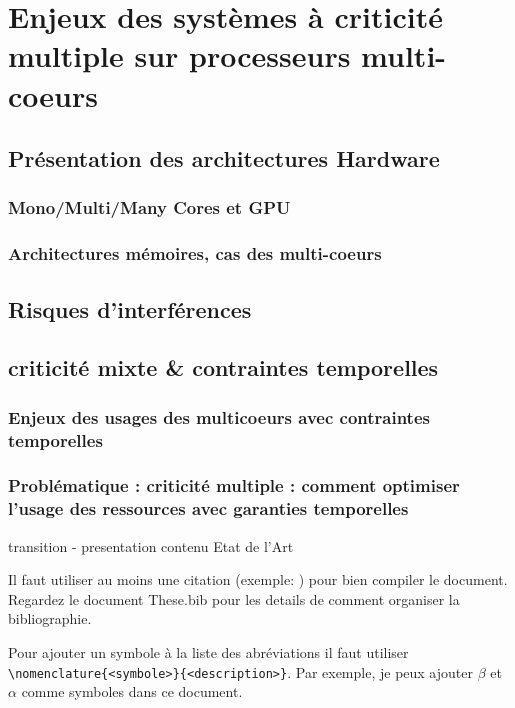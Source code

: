 \documentclass[a4paper,11pt,twoside]{StyleThese}
\begin{document}
\setcounter{chapter}{1} %
\dominitoc
\faketableofcontents
\fi

\chapter{Enjeux des systèmes à criticité multiple sur processeurs multi-coeurs}
\minitoc

\section{Présentation des architectures Hardware}
    \subsection{Mono/Multi/Many Cores et GPU}
    \subsection{Architectures mémoires, cas des multi-coeurs}
\section{Risques d'interférences}
\section{criticité mixte \& contraintes temporelles}
    \subsection{Enjeux des usages des multicoeurs avec contraintes temporelles}
    \subsection{Problématique :  criticité multiple : comment optimiser l'usage des ressources avec garanties temporelles}
transition - presentation contenu Etat de l'Art

Il faut utiliser au moins une citation (exemple: \cite{loche_safe_2020}) pour bien
compiler le document. Regardez le document These.bib pour les details de
comment organiser la bibliographie.

Pour ajouter un symbole à la liste des abréviations il faut utiliser
\verb|\nomenclature{<symbole>}{<description>}|. Par exemple, je peux ajouter
$\beta$ et
$\alpha$ comme
symboles dans ce document.

\ifdefined{}
\else


\end{document}
